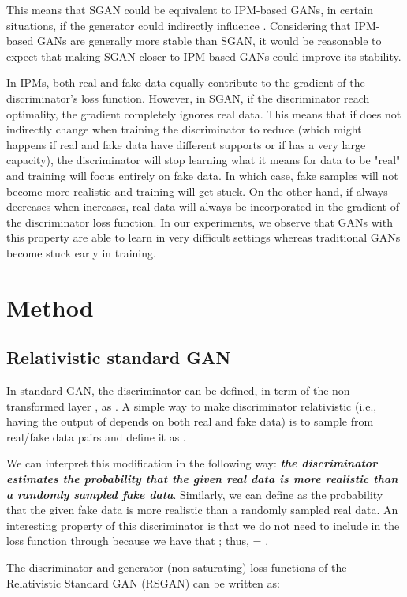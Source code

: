 \documentclass{article}
\begin{document}
This means that SGAN could be equivalent to IPM-based GANs, in certain situations, if the generator could indirectly influence . Considering that IPM-based GANs are generally more stable than SGAN, it would be reasonable to expect that making SGAN closer to IPM-based GANs could improve its stability. 

In IPMs, both real and fake data equally contribute to the gradient of the discriminator's loss function. However, in SGAN, if the discriminator reach optimality, the gradient completely ignores real data. This means that if  does not indirectly change when training the discriminator to reduce  (which might happens if real and fake data have different supports or if  has a very large capacity), the discriminator will stop learning what it means for data to be "real" and training will focus entirely on fake data. In which case, fake samples will not become more realistic and training will get stuck. On the other hand, if  always decreases when  increases, real data will always be incorporated in the gradient of the discriminator loss function. In our experiments, we observe that GANs with this property are able to learn in very difficult settings whereas traditional GANs become stuck early in training.

\section{Method}

\subsection{Relativistic standard GAN}

In standard GAN, the discriminator can be defined, in term of the non-transformed layer , as . A simple way to make discriminator relativistic (i.e., having the output of  depends on both real and fake data) is to sample from real/fake data pairs  and define it as . 

We can interpret this modification in the following way: \textbf{\textit{the discriminator estimates the probability that the given real data is more realistic than a randomly sampled fake data}}. Similarly, we can define  as the probability that the given fake data is more realistic than a randomly sampled real data. An interesting property of this discriminator is that we do not need to include  in the loss function through  because we have that ; thus,  = .

The discriminator and generator (non-saturating) loss functions of the Relativistic Standard GAN (RSGAN) can be written as:
\end{document}
